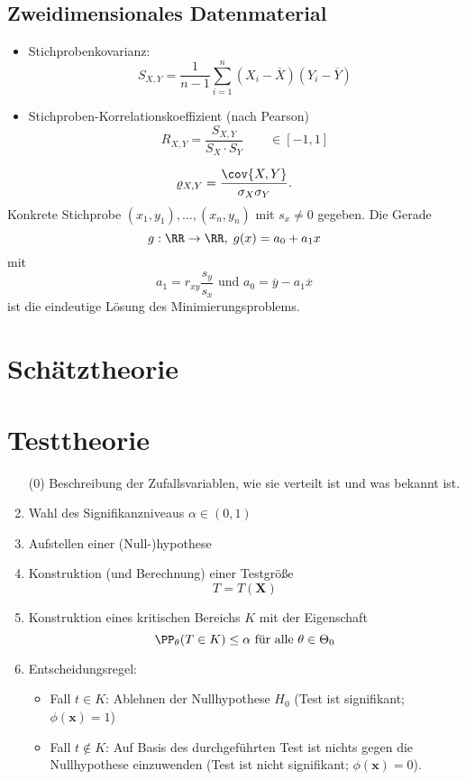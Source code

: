\documentclass{scrreprt}
\begin{document}
\subsection{Zweidimensionales Datenmaterial}

\begin{itemize}
\item Stichprobenkovarianz:
$$S_{X,Y}=\frac{1}{n-1}\sum_{i=1}^n(X_i - \overline{X})(Y_i-\overline{Y})$$
\item Stichproben-Korrelationskoeffizient (nach Pearson)
$$R_{X,Y}=\frac{S_{X,Y}}{S_X\cdot S_Y} \qquad \in [-1,1]$$
\end{itemize}

$$\varrho_{X,Y}=\frac{\cov{X,Y}}{\sigma_X \sigma_Y}\text{.}$$
Konkrete Stichprobe $(x_1,y_1),\ldots, (x_n,y_n)$ mit $s_x\not = 0$ gegeben. Die Gerade 
$$g: \RR\to \RR, \; g(x)=a_0+a_1x$$
mit
$$a_1 = r_{xy}\frac{s_y}{s_x} \text{ und } a_0 = \overline{y} - a_1 \overline{x}$$
ist die eindeutige Lösung des Minimierungsproblems.

\section{Schätztheorie}

\section{Testtheorie}
\begin{enumerate}
\item[(0)] Beschreibung der Zufallsvariablen, wie sie verteilt ist und was bekannt ist.
\item Wahl des Signifikanzniveaus $\alpha \in (0,1)$
\item Aufstellen einer (Null-)hypothese
\item Konstruktion (und Berechnung) einer Testgröße
$$T=T(\mathbf{X})$$
\item Konstruktion eines kritischen Bereichs $K$ mit der Eigenschaft
$$\PP_\theta (T\in K) \leq \alpha \text{ für alle }\theta \in \Theta_0$$
\item Entscheidungsregel:
\begin{itemize}
\item Fall $t\in K$: Ablehnen der Nullhypothese $H_0$ (Test ist signifikant; $\phi(\mathbf{x})=1$)
\item Fall $t \not \in K$: Auf Basis des durchgeführten Test ist nichts gegen die Nullhypothese einzuwenden (Test ist nicht signifikant; $\phi(\mathbf{x})=0$).
\end{itemize}
\end{enumerate}

\end{document}
